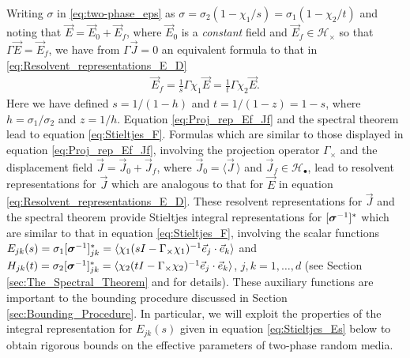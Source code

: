 \documentclass{cmslatex}
\newcommand\bsig{\mbox{\boldmath${\sigma}$}}
\begin{document}
Writing $\sigma$ in \eqref{eq:two-phase_eps} as 
$\sigma=\sigma_2(1-\chi_1/s)=\sigma_1(1-\chi_2/t)$ and noting that
$\vec{E}=\vec{E}_0+\vec{E}_f$, where $\vec{E}_0$ is a \emph{constant}
field and $\vec{E}_f\in\mathscr{H}_\times$ so that $\Gamma\vec{E}=\vec{E}_f$, we
have from $\Gamma\vec{J}=0$ an equivalent formula to that in
\eqref{eq:Resolvent_representations_E_D} 
% 
\begin{align}\label{eq:Proj_rep_Ef_Jf}
  \vec{E}_f=\frac{1}{s}\Gamma\chi_1\vec{E}=\frac{1}{t}\Gamma\chi_2\vec{E}.  
\end{align}
%
Here we have defined  $s=1/(1-h)$ and $t=1/(1-z)=1-s$, where
$h=\sigma_1/\sigma_2$ and $z=1/h$. Equation \eqref{eq:Proj_rep_Ef_Jf} and the
spectral theorem \cite{Reed-1980,Stone:64} lead to equation
\eqref{eq:Stieltjes_F}. Formulas which are similar to those displayed
in equation 
\eqref{eq:Proj_rep_Ef_Jf}, involving the projection operator $\Gamma_\times$ and
the displacement field $\vec{J}=\vec{J}_0+\vec{J}_f$, where
$\vec{J}_0=\langle\vec{J}\,\rangle$ and $\vec{J}_f\in\mathscr{H}_\bullet$, lead to
resolvent representations for $\vec{J}$ which are analogous to that
for $\vec{E}$ in equation
\eqref{eq:Resolvent_representations_E_D}. These resolvent
representations for $\vec{J}$ and the spectral theorem provide 
Stieltjes integral representations for $[\bsig^{-1}]^*$ which
are similar to that in equation \eqref{eq:Stieltjes_F}, involving the
scalar functions \cite{Bergman:AP-78,Murphy:JMP:063506}
$E_{jk}(s)=\sigma_1[\bsig^{-1}]_{jk}^*=\langle\chi_1(sI-\Gamma_\times\chi_1)^{-1}\vec{e}_j\cdot\vec{e}_k\rangle$
and 
$H_{jk}(t)=\sigma_2[\bsig^{-1}]_{jk}^*=\langle\chi_2(tI-\Gamma_\times\chi_2)^{-1}\vec{e}_j\cdot\vec{e}_k\rangle$,
$j,k=1,\ldots,d$ (see Section \ref{sec:The_Spectral_Theorem} and
\cite{Murphy:JMP:063506} for details). These auxiliary functions
are important to the bounding procedure discussed in Section
\ref{sec:Bounding_Procedure}. In particular, we will exploit the
properties of the integral representation for $E_{jk}(s)$ given in
equation \eqref{eq:Stieltjes_Es} below to obtain rigorous bounds on
the effective parameters of two-phase random media. 
\end{document}
